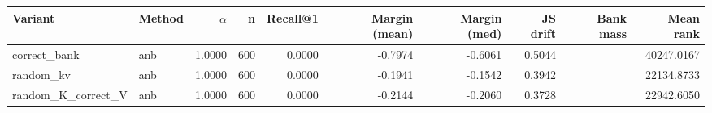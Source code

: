 \begin{tabular}{l l r r r r r r r r}
\toprule
Variant & Method & $\alpha$ & n & Recall@1 & Margin (mean) & Margin (med) & JS drift & Bank mass & Mean rank \\
\midrule
correct\_bank & anb & 1.0000 & 600 & 0.0000 & -0.7974 & -0.6061 & 0.5044 &  & 40247.0167 \\
random\_kv & anb & 1.0000 & 600 & 0.0000 & -0.1941 & -0.1542 & 0.3942 &  & 22134.8733 \\
random\_K\_correct\_V & anb & 1.0000 & 600 & 0.0000 & -0.2144 & -0.2060 & 0.3728 &  & 22942.6050 \\
\bottomrule
\end{tabular}

